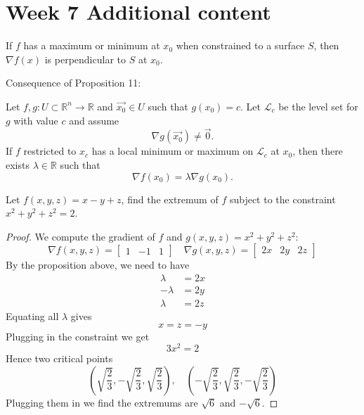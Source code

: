 \documentclass[openany]{book}
\begin{document}
\newpage 
\section*{\centering Week 7 Additional content}



\renewcommand\thesection{\arabic{section}}

\noindent


\begin{prop}
    If $f$ has a maximum or minimum
    at $x_0$ when constrained to a surface $S$, then $\nabla f(x)$ is perpendicular to $S$ at $x_0$.
\end{prop}
Consequence of Proposition 11:
\begin{prop}
Let \( f, g : U \subset \mathbb{R}^n \to \mathbb{R} \) and \(\vec{x_0} \in U\) such that \( g({x_0}) = c \). Let \( \mathcal{L}_c \) be the level set for \( g \) with value \( c \) and assume  
\[
\nabla g(\vec{x_0}) \neq \vec{0}.
\] 
If \( f \) restricted to \( x_c \) has a local minimum or maximum on \( \mathcal{L}_c \) at \( {x_0} \), then there exists \( \lambda \in \mathbb{R} \) such that  
\[
\nabla f({x_0}) = \lambda \nabla g({x_0}).
\]
\end{prop}


\begin{prob}
Let $f(x,y,z)=x-y+z$, find the extremum of $f$ subject to the constraint $x^2+y^2+z^2=2$.
\end{prob}
\begin{proof}
    We compute the gradient of $f$ and $g(x,y,z)=x^2+y^2+z^2$:
    \begin{equation*}
        \nabla f(x,y,z)=\begin{bmatrix}
            1&-1&1
        \end{bmatrix}\quad \nabla g(x,y,z)=\begin{bmatrix}
            2x&2y&2z
        \end{bmatrix}
    \end{equation*}
    By the proposition above, we need to have 
    \begin{align*}
        \lambda&=2x\\
        -\lambda&=2y\\
        \lambda&=2z
    \end{align*}
    Equating all $\lambda$ gives 
    \begin{equation*}
        x=z=-y
    \end{equation*}
    Plugging in the constraint we get 
    \begin{equation*}
        3x^2=2
    \end{equation*}
    Hence two critical points 
    \begin{equation*}
        \left(\sqrt{\frac{2}{3}}, -\sqrt{\frac{2}{3}}, \sqrt{\frac{2}{3}}\right), \quad \left(-\sqrt{\frac{2}{3}}, \sqrt{\frac{2}{3}}, -\sqrt{\frac{2}{3}}\right)
    \end{equation*}
    Plugging them in we find the extremums are $\sqrt{6}$ and $-\sqrt{6}$.
\end{proof}
\end{document}
